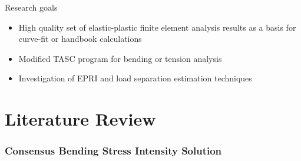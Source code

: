 \begin{frame}
Research goals
\begin{itemize}
\item High quality set of elastic-plastic finite element analysis results as a basis for curve-fit or handbook calculations
\item Modified TASC program for bending or tension analysis
\item Investigation of EPRI and load separation estimation techniques
\end{itemize}
\end{frame}

\part{Literature Review}

\section{Consensus Bending Stress Intensity Solution}

